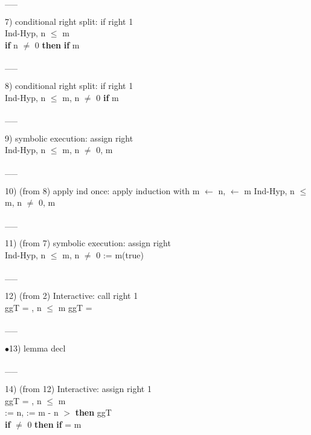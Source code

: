 \documentclass[a4paper]{article}
\begin{document}
\vspace{-1.5ex}\_\hrulefill \_

7) conditional right split: if right  1\\
\tabf Ind-Hyp, n $\le$ m \\
\Fol \Do 
{\bf if} n $\neq$ 0 {\bf then} 
{\bf if} m %

\vspace{-1.5ex}\_\hrulefill \_

8) conditional right split: if right  1\\
Ind-Hyp, n $\le$ m, n $\neq$ 0 \Fol \Do 
{\bf if} m %

\vspace{-1.5ex}\_\hrulefill \_

9) symbolic execution: assign right \\
Ind-Hyp, n $\le$ m, n $\neq$ 0, m %

\vspace{-1.5ex}\_\hrulefill \_

10)  (from 8) apply ind once: apply induction  with m $\leftarrow$ n,  $\leftarrow$ m %
Ind-Hyp, n $\le$ m, n $\neq$ 0, m %

\vspace{-1.5ex}\_\hrulefill \_

11)  (from 7) symbolic execution: assign right \\
Ind-Hyp, n $\le$ m, \Not n $\neq$ 0 \Fol \Do {} := m\Dc (true)

\vspace{-1.5ex}\_\hrulefill \_

12)  (from 2) Interactive: call right  1\\
\Do ggT\Dc {} = , n $\le$ m \Fol \Do ggT\Dc {} = 

\vspace{-1.5ex}\_\hrulefill \_

$\bullet$13) lemma decl \\
 \Fol 

\vspace{-1.5ex}\_\hrulefill \_

14)  (from 12) Interactive: assign right  1\\
\tabf \Do ggT\Dc {} = , n $\le$ m \\
\Fol \Do {} := n,  := m - n\Dc
{}  $>$  {\bf then} ggT \\
 \tabf \tabudo{}\tabudc{} {\bf if}  $\neq$ 0 {\bf then} {\bf if}  %
{} = m
\end{document}
